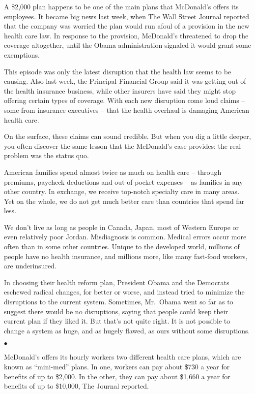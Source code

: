 ﻿\documentclass[12pt]{article}
\begin{document}
A \$2,000 plan happens to be one of the main plans that McDonald's offers its employees. It became
big news last week, when The Wall Street Journal reported that the company was worried the plan
would run afoul of a provision in the new health care law. In response to the provision, McDonald's
threatened to drop the coverage altogether, until the Obama administration signaled it would grant
some exemptions.

This episode was only the latest disruption that the health law seems to be causing. Also last week,
the Principal Financial Group said it was getting out of the health insurance business, while other
insurers have said they might stop offering certain types of coverage. With each new disruption come
loud claims -- some from insurance executives -- that the health overhaul is damaging American
health care.

On the surface, these claims can sound credible. But when you dig a little deeper, you often
discover the same lesson that the McDonald's case provides: the real problem was the status quo.

American families spend almost twice as much on health care -- through premiums, paycheck deductions
and out-of-pocket expenses -- as families in any other country. In exchange, we receive top-notch
specialty care in many areas. Yet on the whole, we do not get much better care than countries that
spend far less.

We don't live as long as people in Canada, Japan, most of Western Europe or even relatively poor
Jordan. Misdiagnosis is common. Medical errors occur more often than in some other countries. Unique
to the developed world, millions of people have no health insurance, and millions more, like many
fast-food workers, are underinsured.

In choosing their health reform plan, President Obama and the Democrats eschewed radical changes,
for better or worse, and instead tried to minimize the disruptions to the current system. Sometimes,
Mr.~Obama went so far as to suggest there would be no disruptions, saying that people could keep
their current plan if they liked it. But that's not quite right. It is not possible to change a
system as huge, and as hugely flawed, as ours without some disruptions.

$\bullet$

McDonald's offers its hourly workers two different health care plans, which are known as
``mini-med'' plans. In one, workers can pay about \$730 a year for benefits of up to \$2,000. In the
other, they can pay about \$1,660 a year for benefits of up to \$10,000, The Journal reported.
\end{document}
